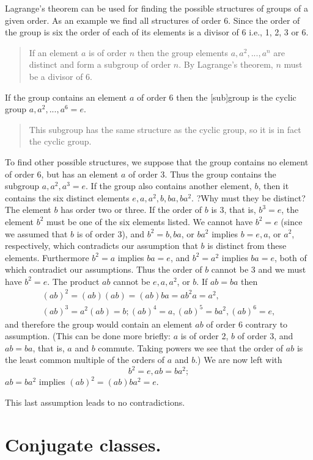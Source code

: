 \documentclass{book}
\begin{document}
Lagrange's theorem can be used for finding the possible structures of
groups of a given order. As an example we find all structures of
order 6. Since the order of the group is six the order of each of its
elements is a divisor of 6 i.e., 1, 2, 3 or 6.
\begin{quote}
If an element $a$ is of order $n$ then the group elements $a,a^2,...,a^n$ are distinct and form a subgroup of order $n$. By Lagrange's theorem, $n$ must be a divisor of 6.
\end{quote}
If the group contains an element
$a$ of order 6 then the [sub]group is the cyclic group $a,a^2,...,a^6 = e$.
\begin{quote}
This subgroup has the same structure as the cyclic group, so it is in fact the cyclic group.
\end{quote}
To find other possible structures, we suppose that the group
contains no element of order 6, but has an element $a$ of order
3. Thus the group contains the subgroup $a,a^2,a^3 = e$.
If the group also contains another element, $b$, then it contains the
six distinct elements $e,a,a^2,b,ba,ba^2$. ?Why must they be distinct? The element
$b$ has order two or three. If the order of $b$ is 3, that is, $b^3 = e$,
the element $b^2$ must be one of the six elements listed.
We cannot have $b^2 = e$ (since we assumed that $b$ is of
order 3), and $b^2 = b, ba$, or $ba^2$ implies $b
= e, a$, or $a^2$, respectively, which contradicts our
assumption that $b$ is distinct from these elements. Furthermore
$b^2 = a$ implies $ba = e$, and $b^2 = a^2$ implies $ba = e$,
both of which contradict our assumptions. Thus the order of $b$
cannot be 3 and we must have $b^2 = e$. The product $ab$ cannot
be $e, a, a^2$, or $b$. If $ab = ba$ then
\begin{multline}
(ab)^2 = (ab)(ab) = (ab)ba = ab^2a = a^2, \\
(ab)^3 = a^2(ab) = b; (ab)^4 = a, (ab)^5 = ba^2, (ab)^6 = e,
\end{multline}
and therefore the group would contain an element $ab$ of order 6
contrary to assumption. (This can be done more briefly: $a$ is of order
2, $b$ of order 3, and $ab = ba$, that is, $a$ and $b$ commute. Taking powers
we see that the order of $ab$ is the least common multiple of the
orders of $a$ and $b$.) We are now left with
$$
b^2 = e, ab = ba^2;
$$
$ab = ba^2$ implies $(ab)^2 = (ab)ba^2 = e$.

This last assumption leads to no contradictions.

\section{Conjugate classes.}
\end{document}

